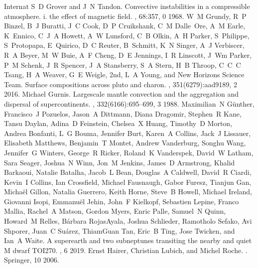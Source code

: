 \documentclass[letterpaper,10pt,english]{jupyterBook}
\begin{document}
\begin{sphinxthebibliography}{Internat}
\sphinxAtStartPar
S D Grover and J N Tandon. Convective instabilities in a compressible atmosphere. i. the effect of magnetic field. , 68:357, 0 1968.
\sphinxAtStartPar
W M Grundy, R P Binzel, B J Buratti, J C Cook, D P Cruikshank, C M Dalle Ore, A M Earle, K Ennico, C J A Howett, A W Lunsford, C B Olkin, A H Parker, S Philippe, S Protopapa, E Quirico, D C Reuter, B Schmitt, K N Singer, A J Verbiscer, R A Beyer, M W Buie, A F Cheng, D E Jennings, I R Linscott, J Wm Parker, P M Schenk, J R Spencer, J A Stansberry, S A Stern, H B Throop, C C C Tsang, H A Weaver, G E Weigle, 2nd, L A Young, and New Horizons Science Team. Surface compositions across pluto and charon. , 351(6279):aad9189, 2 2016.
\sphinxAtStartPar
Michael Gurnis. Large\sphinxhyphen{}scale mantle convection and the aggregation and dispersal of supercontinents. , 332(6166):695–699, 3 1988.
\sphinxAtStartPar
Maximilian N Günther, Francisco J Pozuelos, Jason A Dittmann, Diana Dragomir, Stephen R Kane, Tansu Daylan, Adina D Feinstein, Chelsea X Huang, Timothy D Morton, Andrea Bonfanti, L G Bouma, Jennifer Burt, Karen A Collins, Jack J Lissauer, Elisabeth Matthews, Benjamin T Montet, Andrew Vanderburg, Songhu Wang, Jennifer G Winters, George R Ricker, Roland K Vanderspek, David W Latham, Sara Seager, Joshua N Winn, Jon M Jenkins, James D Armstrong, Khalid Barkaoui, Natalie Batalha, Jacob L Bean, Douglas A Caldwell, David R Ciardi, Kevin I Collins, Ian Crossfield, Michael Fausnaugh, Gabor Furesz, Tianjun Gan, Michaël Gillon, Natalia Guerrero, Keith Horne, Steve B Howell, Michael Ireland, Giovanni Isopi, Emmanuël Jehin, John F Kielkopf, Sebastien Lepine, Franco Mallia, Rachel A Matson, Gordon Myers, Enric Palle, Samuel N Quinn, Howard M Relles, Bárbara Rojas\sphinxhyphen{}Ayala, Joshua Schlieder, Ramotholo Sefako, Avi Shporer, Juan C Suárez, Thiam\sphinxhyphen{}Guan Tan, Eric B Ting, Jose Twicken, and Ian A Waite. A super\sphinxhyphen{}earth and two sub\sphinxhyphen{}neptunes transiting the nearby and quiet M dwarf TOI\sphinxhyphen{}270. , 6 2019.
\sphinxAtStartPar
Ernst Hairer, Christian Lubich, and Michel Roche. . Springer, 10 2006.

\end{sphinxthebibliography}
\end{document}
